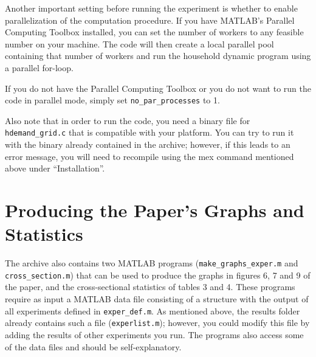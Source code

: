 \documentclass[letterpaper,12pt]{article}
\begin{document}
Another important setting before running the experiment is whether to enable parallelization of the computation procedure. If you have MATLAB's Parallel Computing Toolbox installed, you can set the number of workers to any feasible number on your machine. The code will then create a local parallel pool containing that number of workers and run the household dynamic program using a parallel for-loop.

If you do not have the Parallel Computing Toolbox or you do not want to run the code in parallel mode, simply set \verb|no_par_processes| to 1.

Also note that in order to run the code, you need a binary file for \verb|hdemand_grid.c| that is compatible with your platform. You can try to run it with the binary already contained in the archive; however, if this leads to an error message, you will need to recompile using the mex command mentioned above under ``Installation''.

\section{Producing the Paper's Graphs and Statistics}

The archive also contains two MATLAB programs (\verb|make_graphs_exper.m| and\\
 \verb|cross_section.m|) that can be used to produce the graphs in figures 6, 7 and 9 of the paper, and the cross-sectional statistics of tables 3 and 4. These programs require as input a MATLAB data file consisting of a structure with the output of all experiments defined in \verb|exper_def.m|. As mentioned above, the results folder already contains such a file (\verb|experlist.m|); however, you could modify this file by adding the results of other experiments you run. The programs also access some of the data files and should be self-explanatory.
\end{document}
